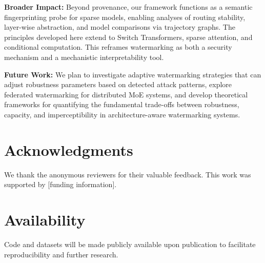 \textbf{Broader Impact:} Beyond provenance, our framework functions as a semantic fingerprinting probe for sparse models, enabling analyses of routing stability, layer-wise abstraction, and model comparisons via trajectory graphs. The principles developed here extend to Switch Transformers, sparse attention, and conditional computation. This reframes watermarking as both a security mechanism and a mechanistic interpretability tool.

\textbf{Future Work:} We plan to investigate adaptive watermarking strategies that can adjust robustness parameters based on detected attack patterns, explore federated watermarking for distributed MoE systems, and develop theoretical frameworks for quantifying the fundamental trade-offs between robustness, capacity, and imperceptibility in architecture-aware watermarking systems.

\section*{Acknowledgments}

We thank the anonymous reviewers for their valuable feedback. This work was supported by [funding information].

\section*{Availability}

Code and datasets will be made publicly available upon publication to facilitate reproducibility and further research.






